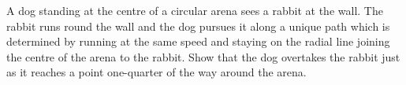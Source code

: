 A dog standing at the centre of a circular arena sees a rabbit at the wall.  The rabbit runs round the wall and the dog pursues it along a unique path which is determined by running at the same speed and staying on the radial line joining the centre of the arena to the rabbit.  Show that the dog overtakes the rabbit just as it reaches a point one-quarter of the way around the arena.